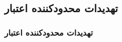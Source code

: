 \label{threats_to_validity}

\subsection{تهدیدات محدودکننده اعتبار}
\begin{frame}
\frametitle{تهدیدات محدودکننده اعتبار}

\end{frame}
